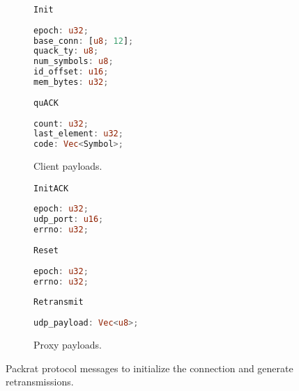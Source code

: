 \begin{figure}[t]
    \begin{subfigure}[b]{0.48\linewidth}
        \begin{protopayload}{\texttt{Init}}
            \begin{lstlisting}[language=Rust]
epoch: u32;
base_conn: [u8; 12];
quack_ty: u8;
num_symbols: u8;
id_offset: u16;
mem_bytes: u32;
            \end{lstlisting}
        \end{protopayload}
        \begin{protopayload}{\texttt{quACK}}
            \begin{lstlisting}[language=Rust]
count: u32;
last_element: u32;
code: Vec<Symbol>;
            \end{lstlisting}
        \end{protopayload}
        \caption{Client payloads.}
        \label{fig:packrat:payloads:client}
    \end{subfigure}
    \hfill
    \begin{subfigure}[b]{0.48\linewidth}
        \begin{protopayload}{\texttt{InitACK}}
            \begin{lstlisting}[language=Rust]
epoch: u32;
udp_port: u16;
errno: u32;
            \end{lstlisting}
        \end{protopayload}
        \begin{protopayload}{\texttt{Reset}}
            \begin{lstlisting}[language=Rust]
epoch: u32;
errno: u32;
            \end{lstlisting}
        \end{protopayload}
        \begin{protopayload}{\texttt{Retransmit}}
            \begin{lstlisting}[language=Rust]
udp_payload: Vec<u8>;
            \end{lstlisting}
        \end{protopayload}
        \caption{Proxy payloads.}
        \label{fig:packrat:payloads:proxy}
    \end{subfigure}
  \caption{Packrat protocol messages to initialize the connection and generate
   retransmissions.}
  \label{fig:packrat:payloads}
\end{figure}
